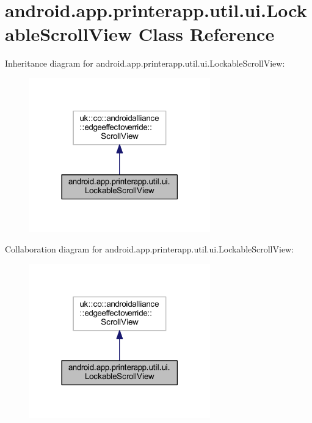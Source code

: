 \hypertarget{classandroid_1_1app_1_1printerapp_1_1util_1_1ui_1_1_lockable_scroll_view}{}\section{android.\+app.\+printerapp.\+util.\+ui.\+Lockable\+Scroll\+View Class Reference}
\label{classandroid_1_1app_1_1printerapp_1_1util_1_1ui_1_1_lockable_scroll_view}


Inheritance diagram for android.\+app.\+printerapp.\+util.\+ui.\+Lockable\+Scroll\+View\+:
\nopagebreak
\begin{figure}[H]
\begin{center}
\leavevmode
\includegraphics[width=222pt]{classandroid_1_1app_1_1printerapp_1_1util_1_1ui_1_1_lockable_scroll_view__inherit__graph}
\end{center}
\end{figure}


Collaboration diagram for android.\+app.\+printerapp.\+util.\+ui.\+Lockable\+Scroll\+View\+:
\nopagebreak
\begin{figure}[H]
\begin{center}
\leavevmode
\includegraphics[width=222pt]{classandroid_1_1app_1_1printerapp_1_1util_1_1ui_1_1_lockable_scroll_view__coll__graph}
\end{center}
\end{figure}

